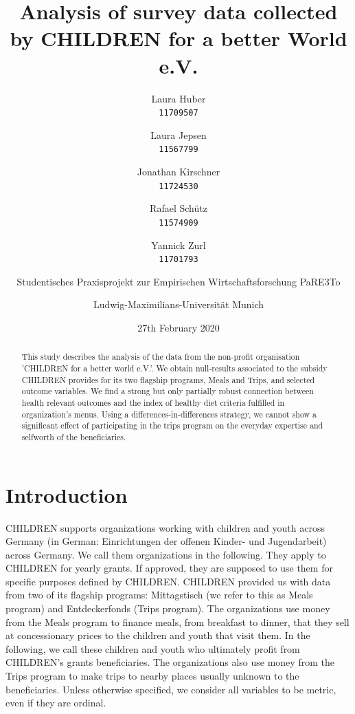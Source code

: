 \documentclass[12pt, a4paper, titlepage]{article}\usepackage[]{graphicx}\usepackage[]{color}
\title{Analysis of survey data collected by CHILDREN for a better World e.V.}
\author{
Laura Huber\\
\texttt{11709507}
\and
Laura Jepsen\\
\texttt{11567799}
\and
Jonathan Kirschner\\
\texttt{11724530}
\and
Rafael Schütz\\
\texttt{11574909} 
\and 
Yannick Zurl\\
\texttt{11701793}
\and
Studentisches Praxisprojekt zur Empirischen Wirtschaftsforschung PaRE3To\\
\and
Ludwig-Maximilians-Universität Munich
}
\date{27th February 2020}
\begin{document}
\maketitle

\tableofcontents
\listoftables

\listoffigures

\begin{abstract} 
This study describes the analysis of the data from the non-profit organisation 'CHILDREN for a better world e.V.'. We obtain null-results associated to the subsidy CHILDREN provides for its two flagship programs, Meals and Trips, and selected outcome variables. We find a strong but only partially robust connection between health relevant outcomes and the index of healthy diet criteria fulfilled in organization's menus. Using a differences-in-differences strategy, we cannot show a significant effect of participating in the trips program on the everyday expertise and selfworth of the beneficiaries.
\end{abstract}

\section{Introduction}

CHILDREN supports organizations working with children and youth across Germany (in German: Einrichtungen der offenen Kinder- und Jugendarbeit) across Germany. We call them organizations in the following. They apply to CHILDREN for yearly grants. If approved, they are supposed to use them for specific purposes defined by CHILDREN. CHILDREN provided us with data from two of its flagship programs: Mittagstisch (we refer to this as Meals program) and Entdeckerfonds (Trips program). The organizations use money from the Meals program to finance meals, from breakfast to dinner, that they sell at concessionary prices to the children and youth that visit them. In the following, we call these children and youth who ultimately profit from CHILDREN's grants beneficiaries. The organizations also use money from the Trips program to make trips to nearby places usually unknown to the beneficiaries.  
Unless otherwise specified, we consider all variables to be metric, even if they are ordinal. 
\end{document}
